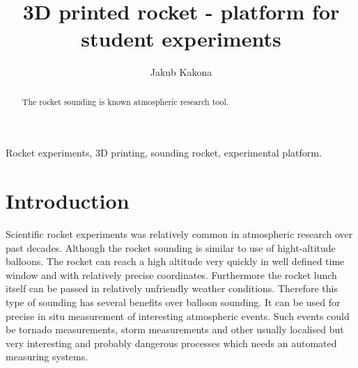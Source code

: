 \documentclass{poster16}
\begin{document}

%
\title{3D printed rocket - platform for student experiments}
%

%
\author{Jakub Kakona }
%


\maketitle


\begin{abstract}
The rocket sounding is known atmospheric research tool. 
\end{abstract}

\begin{keywords}
Rocket experiments, 3D printing, sounding rocket, experimental platform.
\end{keywords}


\section{Introduction}

Scientific rocket experiments was relatively common in atmospheric research over past decades. Although the rocket sounding is similar to use of hight-altitude balloons. The rocket can reach a high altitude very quickly in well defined time window and with relatively precise coordinates. Furthermore the rocket lunch itself can be passed in relatively unfriendly weather conditions. Therefore this type of sounding has several benefits over balloon sounding. It can be used for precise in situ measurement of interesting atmospheric events. Such events could be tornado measurements, storm measurements and other usually localised but very interesting and probably dangerous processes which needs an automated measuring systems. 
\end{document}
